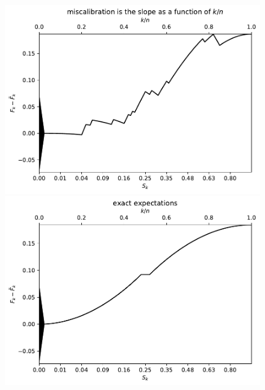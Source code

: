 \documentclass{article}
\begin{document}
\begin{figure}
\begin{centering}

\parbox{\imsize}{\includegraphics[width=\imsize]
                {./codes/unweighted/100_4_1_2/cumulative.pdf}}
\quad\quad
\parbox{\imsize}{\includegraphics[width=\imsize]
                {./codes/unweighted/100_4_1_2/cumulative_exact.pdf}}

\vspace{\vertsep}


\end{centering}
\end{figure}
\end{document}
